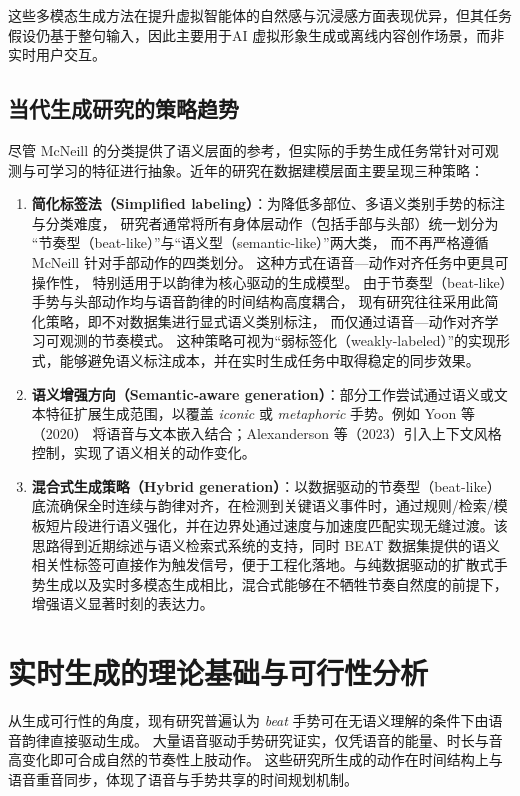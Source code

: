 这些多模态生成方法在提升虚拟智能体的自然感与沉浸感方面表现优异，但其任务假设仍基于整句输入，因此主要用于AI 虚拟形象生成或离线内容创作场景，而非实时用户交互。

\subsection{当代生成研究的策略趋势}
尽管 McNeill 的分类提供了语义层面的参考，但实际的手势生成任务常针对可观测与可学习的特征进行抽象。近年的研究在数据建模层面主要呈现三种策略：

\begin{enumerate}
  \item \textbf{简化标签法（Simplified labeling）}：为降低多部位、多语义类别手势的标注与分类难度，
    研究者通常将所有身体层动作（包括手部与头部）统一划分为
    “节奏型（beat-like）”与“语义型（semantic-like）”两大类，
    而不再严格遵循 McNeill 针对手部动作的四类划分。
    这种方式在语音—动作对齐任务中更具可操作性，
    特别适用于以韵律为核心驱动的生成模型。
    由于节奏型（beat-like）手势与头部动作均与语音韵律的时间结构高度耦合，
    现有研究往往采用此简化策略，即不对数据集进行显式语义类别标注，
    而仅通过语音—动作对齐学习可观测的节奏模式。
    这种策略可视为“弱标签化（weakly-labeled）”的实现形式，能够避免语义标注成本，并在实时生成任务中取得稳定的同步效果。
  \item \textbf{语义增强方向（Semantic-aware generation）}：部分工作尝试通过语义或文本特征扩展生成范围，以覆盖 \emph{iconic} 或 \emph{metaphoric} 手势。例如 Yoon 等（2020）\cite{yoon2020speechgesturebert} 将语音与文本嵌入结合；Alexanderson 等（2023）\cite{alexanderson2023diffgesture}引入上下文风格控制，实现了语义相关的动作变化。
  \item \textbf{混合式生成策略（Hybrid generation）}：以数据驱动的节奏型（beat-like）底流确保全时连续与韵律对齐，在检测到关键语义事件时，通过规则/检索/模板短片段进行语义强化，并在边界处通过速度与加速度匹配实现无缝过渡。该思路得到近期综述与语义检索式系统的支持\cite{zhang2024SemanticGesticulator}，同时 BEAT 数据集提供的语义相关性标签可直接作为触发信号\cite{beatcamn}，便于工程化落地。与纯数据驱动的扩散式手势生成\cite{alexanderson2023diffgesture,tamingDiffgesture}以及实时多模态生成\cite{diffsheg}相比，混合式能够在不牺牲节奏自然度的前提下，增强语义显著时刻的表达力。
\end{enumerate}

\section{实时生成的理论基础与可行性分析}
从生成可行性的角度，现有研究普遍认为 \emph{beat} 手势可在无语义理解的条件下由语音韵律直接驱动生成。
大量语音驱动手势研究证实，仅凭语音的能量、时长与音高变化即可合成自然的节奏性上肢动作\cite{ginosar2019speech2gesture,alexanderson2020stylegestures,kucherenko2021movingfastslow}。
这些研究所生成的动作在时间结构上与语音重音同步，体现了语音与手势共享的时间规划机制。

